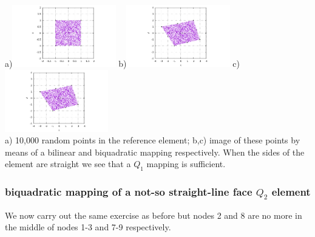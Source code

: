 \begin{center}
a)\includegraphics[width=4.5cm]{images/mappings/biquadratic/rs.pdf}
b)\includegraphics[width=4.5cm]{images/mappings/biquadratic/xyQ1.pdf}
c)\includegraphics[width=4.5cm]{images/mappings/biquadratic/xyQ2.pdf}\\
{\small a) 10,000 random points in the reference element; b,c) image of these points
by means of a bilinear and biquadratic mapping respectively. When the sides of the element
are straight we see that a $Q_1$ mapping is sufficient.}
\end{center}

\subsubsection{biquadratic mapping of a not-so straight-line face $Q_2$ element }

We now carry out the same exercise as before but nodes 2 and 8 are no more 
in the middle of nodes 1-3 and 7-9 respectively.

